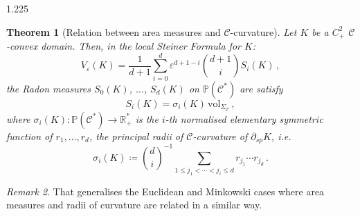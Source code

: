 \documentclass[reqno, a4paper]{amsart}
\numberwithin{equation}{section}
\numberwithin{figure}{section}
\newtheorem{theorem}{Theorem}[section]
\theoremstyle{definition}
\theoremstyle{remark}
\newtheorem{remark}[theorem]{Remark}
\newcommand{\R}{\mathbb{R}} %
\renewcommand{\P}{\mathbb{P}} %
\newcommand{\C}{\mathcal{C}} %
\renewcommand{\S}{\Sigma_\C} %
\newcommand{\vol}{\mathrm{vol}} %
\begin{document}
\begin{spacing}{1.225}
\begin{theorem}[Relation between area measures and $\C$-curvature]
\label{theo Steiner formula for C2+}
Let $K$ be a $C^2_+$ $\C$-convex domain. Then, in the local Steiner Formula for $K$:
\begin{equation*}
V_\varepsilon(K) = \frac{1}{d+1}\sum_{i=0}^{d}\varepsilon^{d+1-i} \binom{d+1}{i} S_i(K) \, ,
\end{equation*}
the Radon measures $S_0(K)$, $\dots$, $S_d(K)$ on $\P(\C^*)$ are satisfy
\begin{equation*}
S_i(K) = \sigma_i(K) \, \vol_{\S} \, ,
\end{equation*}
where $\sigma_i(K) : \P(\C^*) \to \R^*_+$ is the $i$-th normalised elementary symmetric function of $r_1,\dots,r_d$, the principal radii of $\C$-curvature of $\partial_{sp}K$, i.e. 
\begin{equation}
\label{eq def sym function}
\sigma_i(K) \coloneqq \binom{d}{i}^{-1}\sum_{1\leq j_1<\cdots<j_i\leq d} r_{j_1}\cdots r_{j_d} \, . 
\end{equation}
\end{theorem}

\begin{remark}
That generalises the Euclidean \cite[subsection 2.5 and Section 4]{Schneider_93} and Minkowski \cite[subsection 3.1.2]{Fillastre_Veronelli_16} cases where area measures and radii of curvature are related in a similar way. 
\end{remark}


\end{spacing}
\end{document}
